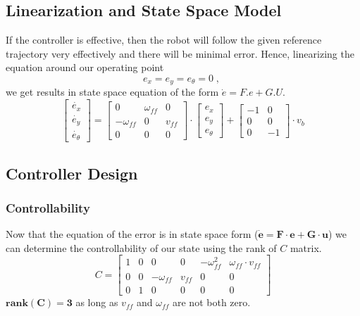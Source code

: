 \documentclass[conference]{IEEEtran}
\begin{document}
\subsection{Linearization and State Space Model}
If the controller is effective, then the robot will follow the given reference trajectory very effectively and there will be minimal error. Hence, linearizing the equation around our operating point
\[
e_{x}=e_{y}=e_{\theta}=0 \;,\;
\]
we get results in state space equation of the form $\dot{e}=F.e+G.U$.
\begin{equation}\label{eq}
\begin{bmatrix}
\dot{e_{x}}\\ 
\dot{e_{y}}\\ 
\dot{e_{\theta}}
\end{bmatrix}
=
\begin{bmatrix}
0 & \omega_{ff} & 0\\ 
-\omega_{ff} & 0 & v_{ff}\\ 
0 & 0 & 0
\end{bmatrix}
\cdot 
\begin{bmatrix}
e_{x}\\ 
e_{y}\\ 
e_{\theta}
\end{bmatrix}
+
\begin{bmatrix}
-1 & 0\\ 
0 & 0\\
0 & -1
\end{bmatrix}
\cdot 
v_{b}
\end{equation}

\subsection{Controller Design}
\subsubsection{Controllability}
Now that the equation of the error is in state space form ($ \mathbf{\dot{e} = F \cdot e + G \cdot u} $) we can determine the controllability of our state using the rank of $C$ matrix.
\begin{equation}\label{eq}
C = 
\begin{bmatrix}
1 & 0 & 0       & 0& -\omega_{ff}^{2} & \omega_{ff}\cdot v_{ff}\\ 
0 & 0 & -\omega_{ff} & v_{ff}        & 0          & 0\\ 
0 & 1 & 0       & 0& 0          & 0
\end{bmatrix}
\end{equation}
$\mathbf{ rank(C) = 3 }$ as long as $v_{ff}$ and $\omega_{ff}$ are not both zero.
\end{document}
